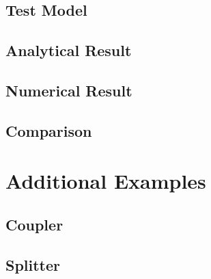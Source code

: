 \subsection{Test Model}
\subsection{Analytical Result}
\subsection{Numerical Result}
\subsection{Comparison}
\section{Additional Examples}
\subsection{Coupler}
\subsection{Splitter}


